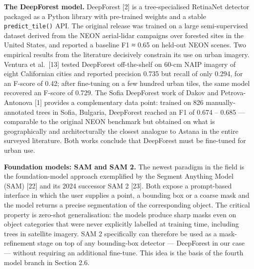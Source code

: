 \textbf{The DeepForest model.} DeepForest {[}2{]} is a tree-specialised RetinaNet detector packaged as a Python library with pre-trained weights and a stable \texttt{predict\_tile()} API. The original release was trained on a large semi-supervised dataset derived from the NEON aerial-lidar campaigns over forested sites in the United States, and reported a baseline F1 ≈ 0.65 on held-out NEON scenes. Two empirical results from the literature decisively constrain its use on urban imagery. Ventura et al.~{[}13{]} tested DeepForest off-the-shelf on 60-cm NAIP imagery of eight Californian cities and reported precision 0.735 but recall of only 0.294, for an F-score of 0.42; after fine-tuning on a few hundred urban tiles, the same model recovered an F-score of 0.729. The Sofia DeepForest work of Dakov and Petrova-Antonova {[}1{]} provides a complementary data point: trained on 826 manually-annotated trees in Sofia, Bulgaria, DeepForest reached an F1 of 0.674 -- 0.685 --- comparable to the original NEON benchmark but obtained on what is geographically and architecturally the closest analogue to Astana in the entire surveyed literature. Both works conclude that DeepForest must be fine-tuned for urban use.

\textbf{Foundation models: SAM and SAM 2.} The newest paradigm in the field is the foundation-model approach exemplified by the Segment Anything Model (SAM) {[}22{]} and its 2024 successor SAM 2 {[}23{]}. Both expose a prompt-based interface in which the user supplies a point, a bounding box or a coarse mask and the model returns a precise segmentation of the corresponding object. The critical property is zero-shot generalisation: the models produce sharp masks even on object categories that were never explicitly labelled at training time, including trees in satellite imagery. SAM 2 specifically can therefore be used as a mask-refinement stage on top of any bounding-box detector --- DeepForest in our case --- without requiring an additional fine-tune. This idea is the basis of the fourth model branch in Section 2.6.

